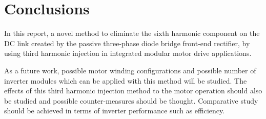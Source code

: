 \chapter{Conclusions}

In this report, a novel method to eliminate the sixth harmonic component on the DC link created by the passive three-phase diode bridge front-end rectifier, by using third harmonic injection in integrated modular motor drive applications.

As a future work, possible motor winding configurations and possible number of inverter modules which can be applied with this method will be studied. The effects of this third harmonic injection method to the motor operation should also be studied and possible counter-measures should be thought. Comparative study should be achieved in terms of inverter performance such as efficiency.

